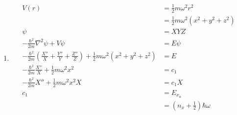 \documentclass{article}
\begin{document}
\setcounter{subsection}{45}
\subsection{}

\begin{enumerate}
  \item

        \begin{align*}
          V(r)                                                                                                                         & = \frac{1}{2} m \omega^2 r^2                                \\
                                                                                                                                       & = \frac{1}{2} m \omega^2 (x^2 + y^2 + z^2)                  \\
          \psi                                                                                                                         & = X Y Z                                                     \\
          -\frac{\hbar^2}{2 m} \nabla^2 \psi + V \psi                                                                                  & = E \psi                                                    \\
          -\frac{\hbar^2}{2 m} \left( \frac{X''}{X} + \frac{Y''}{Y} + \frac{Z''}{Z} \right) + \frac{1}{2} m \omega^2 (x^2 + y^2 + z^2) & = E                                                         \\
          -\frac{\hbar^2}{2 m} \frac{X''}{X} + \frac{1}{2} m \omega^2 x^2                                                              & = c_1                                                       \\
          -\frac{\hbar^2}{2 m} X'' + \frac{1}{2} m \omega^2 x^2 X                                                                      & = c_1 X                                                     \\
          c_1                                                                                                                          & = E_{x_n}                                                   \\
                                                                                                                                       & = \left( n_x + \frac{1}{2} \right) \hbar \omega             \\

\end{align*}
\end{enumerate}
\end{document}
